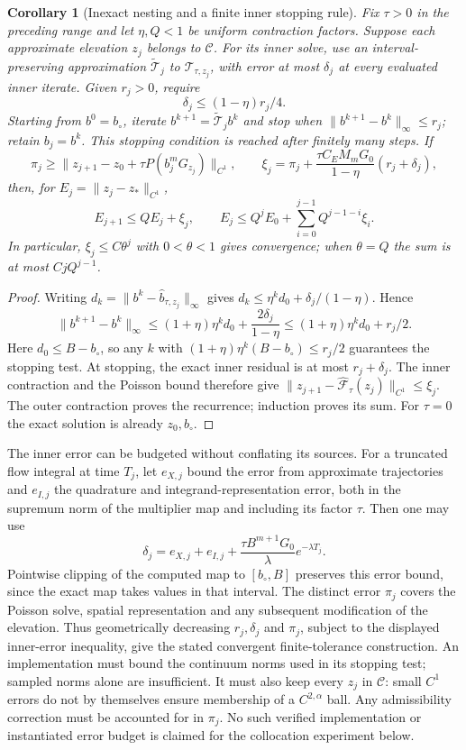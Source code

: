 \documentclass[11pt,a4paper]{article}
\newtheorem{corollary}[theorem]{Corollary}
\theoremstyle{definition}\newtheorem{definition}[theorem]{Definition}
\theoremstyle{remark}\newtheorem{remark}[theorem]{Remark}
\begin{document}
\begin{corollary}[Inexact nesting and a finite inner stopping rule]\label{cor:inexact}
Fix $\tau>0$ in the preceding range and let $\eta,Q<1$ be uniform contraction
factors. Suppose each approximate elevation $z_j$ belongs to $\mathcal C$.
For its inner solve, use an interval-preserving approximation
$\widetilde{\mathcal T}_j$ to $\mathcal T_{\tau,z_j}$, with error
at most $\delta_j$ at every evaluated inner iterate. Given $r_j>0$, require
\[
 \delta_j\leq(1-\eta)r_j/4.
\]
Starting from $b^0=b_\circ$, iterate $b^{k+1}=\widetilde{\mathcal T}_jb^k$
and stop when $\|b^{k+1}-b^k\|_\infty\leq r_j$; retain $b_j=b^k$.
This stopping condition is reached after finitely many steps. If
\[
 \pi_j\geq\|z_{j+1}-z_0+\tau P(b_j^mG_{z_j})\|_{C^1},\qquad
 \xi_j=\pi_j+\frac{\tau C_EM_mG_0}{1-\eta}(r_j+\delta_j),
\]
then, for $E_j=\|z_j-z_*\|_{C^1}$,
\[
 E_{j+1}\leq QE_j+\xi_j,\qquad
 E_j\leq Q^jE_0+\sum_{i=0}^{j-1}Q^{j-1-i}\xi_i.
\]
In particular, $\xi_j\leq C\theta^j$ with $0<\theta<1$ gives convergence;
when $\theta=Q$ the sum is at most $CjQ^{j-1}$.
\end{corollary}
\begin{proof}
Writing $d_k=\|b^k-\widehat b_{\tau,z_j}\|_\infty$ gives
$d_k\leq\eta^kd_0+\delta_j/(1-\eta)$. Hence
\[
 \|b^{k+1}-b^k\|_\infty
 \leq(1+\eta)\eta^kd_0+\frac{2\delta_j}{1-\eta}
 \leq(1+\eta)\eta^kd_0+r_j/2.
\]
Here $d_0\leq B-b_\circ$, so any $k$ with
$(1+\eta)\eta^k(B-b_\circ)\leq r_j/2$ guarantees the stopping test.
At stopping, the exact inner residual is at
most $r_j+\delta_j$. The inner contraction and the Poisson bound therefore
give $\|z_{j+1}-\widehat{\mathcal F}_\tau(z_j)\|_{C^1}\leq\xi_j$.
The outer contraction proves the recurrence; induction proves its sum.
For $\tau=0$ the exact solution is already $z_0,b_\circ$.
\end{proof}

The inner error can be budgeted without conflating its sources. For a truncated
flow integral at time $T_j$, let $e_{X,j}$ bound the error from approximate
trajectories and $e_{I,j}$ the quadrature and integrand-representation error,
both in the supremum norm of the multiplier map and including its factor
$\tau$. Then one may use
\[
 \delta_j=e_{X,j}+e_{I,j}
       +\frac{\tau B^{m+1}G_0}{\lambda}e^{-\lambda T_j}.
\]
Pointwise clipping of the computed map to $[b_\circ,B]$ preserves this error
bound, since the exact map takes values in that interval. The distinct error
$\pi_j$ covers the Poisson solve, spatial representation and any subsequent
modification of the elevation. Thus geometrically decreasing $r_j,\delta_j$
and $\pi_j$, subject to the displayed inner-error inequality, give the stated
convergent finite-tolerance construction. An implementation must bound the
continuum norms used in its stopping test; sampled norms alone are insufficient.
It must also keep every $z_j$ in $\mathcal C$: small $C^1$ errors do not by
themselves ensure membership of a $C^{2,\alpha}$ ball. Any admissibility
correction must be accounted for in $\pi_j$. No such verified implementation
or instantiated error budget is claimed for the collocation experiment below.
\end{document}
